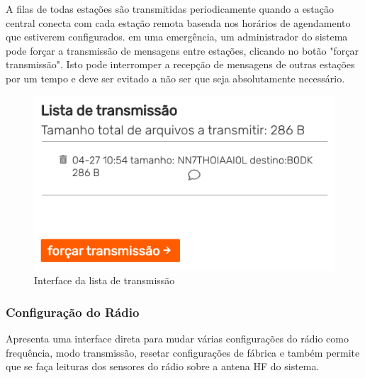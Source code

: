 \documentclass[11pt,a4paper]{article}
\begin{document}
A filas de todas estações são transmitidas periodicamente quando a estação central conecta com cada estação remota baseada nos horários de agendamento que estiverem configurados. em uma emergência, um administrador do sistema pode forçar a transmissão de mensagens entre estações, clicando no botão "forçar transmissão". Isto pode interromper a recepção de mensagens de outras estações por um tempo e deve ser evitado a não ser que seja absolutamente necessário.

    \begin{figure}[H]
    \centering
    \includegraphics[width=0.5\columnwidth]{screenshots/frontend/pt_kn/transmissionlist.png}
    \caption{Interface da lista de transmissão}
    \label{fig:transmission}
   
    \end{figure}    
    
    
\subsubsection{Configuração do Rádio}
\label{gui_radio_config}

Apresenta uma interface direta para mudar várias configurações do rádio como frequência, modo transmissão, resetar configurações de fábrica e também permite que se faça leituras dos sensores do rádio sobre a antena HF do sistema.


\end{document}

